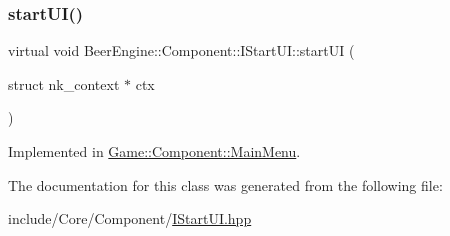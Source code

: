 \subsubsection{\texorpdfstring{start\+U\+I()}{startUI()}}
{\footnotesize\ttfamily virtual void Beer\+Engine\+::\+Component\+::\+I\+Start\+U\+I\+::start\+UI (\begin{DoxyParamCaption}\item[{struct nk\+\_\+context $\ast$}]{ctx }\end{DoxyParamCaption})\hspace{0.3cm}{\ttfamily [pure virtual]}}



Implemented in \mbox{\hyperlink{class_game_1_1_component_1_1_main_menu_ae50614def462ca82eb6c4404ee82a82e}{Game\+::\+Component\+::\+Main\+Menu}}.



The documentation for this class was generated from the following file\+:\begin{DoxyCompactItemize}
\item 
include/\+Core/\+Component/\mbox{\hyperlink{_i_start_u_i_8hpp}{I\+Start\+U\+I.\+hpp}}\end{DoxyCompactItemize}
